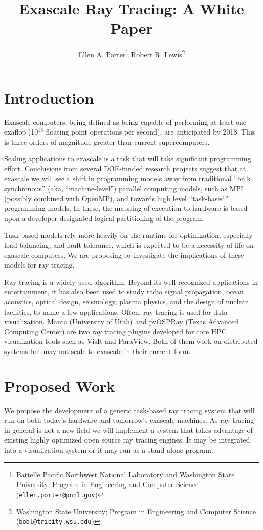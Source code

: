 \documentclass[12pt]{article}
\title{Exascale Ray Tracing: A White Paper}
\author{Ellen A. Porter\footnote{
    Battelle Pacific Northwest National Laboratory 
    and Washington State University;
    Program in Engineering and Computer Science
    (\texttt{ellen.porter@pnnl.gov})
  }
\hspace{1in} Robert R. Lewis\footnote{
    Washington State University;
    Program in Engineering and Computer Science
    (\texttt{bobl@tricity.wsu.edu})
  }
}
\begin{document}
\maketitle
\section*{Introduction}

Exascale computers, being defined as being capable of performing at
least one exaflop (10$^{18}$ floating point operations per second),
are anticipated by 2018. This is three orders of magnitude greater
than current supercomputers.

Scaling applications to exascale is a task that will take significant
programming effort. Conclusions from several DOE-funded research
projects suggest that at exascale we will see a shift in programming
models away from traditional ``bulk synchronous'' (aka,
``machine-level'') parallel computing models, such as MPI (possibly
combined with OpenMP), and towards high level ``task-based''
programming models. In these, the mapping of execution to hardware is
based upon a developer-designated logical partitioning of the program.

Task-based models rely more heavily on the runtime for optimization,
especially load balancing, and fault tolerance, which is expected to
be a necessity of life on exascale computers. We are proposing to
investigate the implications of these models for ray tracing.

Ray tracing is a widely-used algorithm. Beyond its well-recognized
applications in entertainment, it has also been used to study radio
signal propagation, ocean acoustics, optical design, seismology,
plasma physics, and the design of nuclear facilities, to name a few
applications. Often, ray tracing is used for data visualization. Manta
(University of Utah) and pvOSPRay (Texas Advanced Computing Center)
are two ray tracing plugins developed for core HPC visualization tools
such as VisIt and ParaView. Both of them work on distributed systems
but may not scale to exascale in their current form.

\section*{Proposed Work}

We propose the development of a generic task-based ray tracing system
that will run on both today's hardware and tomorrow's exascale
machines. As ray tracing in general is not a new field we will
implement a system that takes advantage of existing highly optimized
open source ray tracing engines. It may be integrated into a
visualization system or it may run as a stand-alone program.
\end{document}
